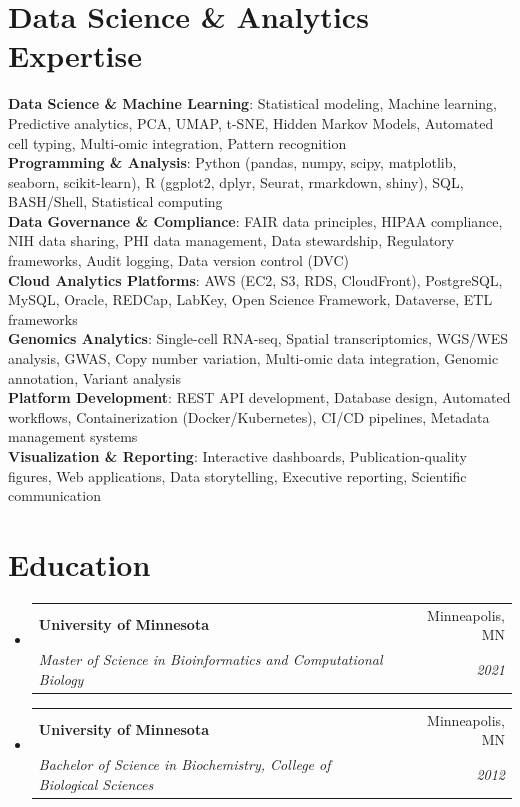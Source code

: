 \documentclass[letterpaper,10]{article}
\makeatletter
\newcommand{\resumeSubheading}[4]{
  \vspace{-2pt}\item
    \begin{tabular*}{0.97\textwidth}[t]{l@{\extracolsep{\fill}}r}
      \textbf{#1} & #2 \\
      \textit{\small#3} & \textit{\small #4} \\
    \end{tabular*}\vspace{-7pt}
}
\newcommand{\resumeSubHeadingListStart}{\begin{itemize}[leftmargin=0.15in, label={}]}
\newcommand{\resumeSubHeadingListEnd}{\end{itemize}}
\makeatother
\begin{document}
\section{Data Science \& Analytics Expertise}
 \begin{itemize}[leftmargin=0.15in, label={}]
    \small{\item{
     \textbf{Data Science \& Machine Learning}{: Statistical modeling, Machine learning, Predictive analytics, PCA, UMAP, t-SNE, Hidden Markov Models, Automated cell typing, Multi-omic integration, Pattern recognition} \\
     \textbf{Programming \& Analysis}{: Python (pandas, numpy, scipy, matplotlib, seaborn, scikit-learn), R (ggplot2, dplyr, Seurat, rmarkdown, shiny), SQL, BASH/Shell, Statistical computing} \\
     \textbf{Data Governance \& Compliance}{: FAIR data principles, HIPAA compliance, NIH data sharing, PHI data management, Data stewardship, Regulatory frameworks, Audit logging, Data version control (DVC)} \\
     \textbf{Cloud Analytics Platforms}{: AWS (EC2, S3, RDS, CloudFront), PostgreSQL, MySQL, Oracle, REDCap, LabKey, Open Science Framework, Dataverse, ETL frameworks} \\
     \textbf{Genomics Analytics}{: Single-cell RNA-seq, Spatial transcriptomics, WGS/WES analysis, GWAS, Copy number variation, Multi-omic data integration, Genomic annotation, Variant analysis} \\
     \textbf{Platform Development}{: REST API development, Database design, Automated workflows, Containerization (Docker/Kubernetes), CI/CD pipelines, Metadata management systems} \\
     \textbf{Visualization \& Reporting}{: Interactive dashboards, Publication-quality figures, Web applications, Data storytelling, Executive reporting, Scientific communication}
    }}
 \end{itemize}

\section{Education}
  \resumeSubHeadingListStart
    \resumeSubheading
      {University of Minnesota}{Minneapolis, MN}
      {Master of Science in Bioinformatics and Computational Biology}{2021}
    \resumeSubheading
      {University of Minnesota}{Minneapolis, MN}
      {Bachelor of Science in Biochemistry, College of Biological Sciences}{2012}
  \resumeSubHeadingListEnd

\end{document}
